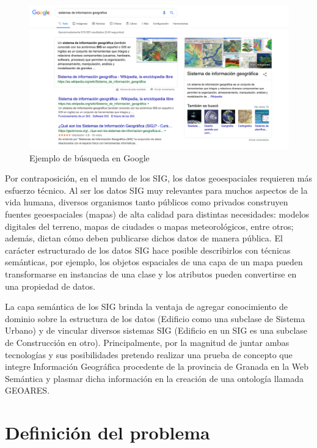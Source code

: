 \begin{figure}[H]
	\centering
	\includegraphics[width=1.07\linewidth]{imagenes/capitulo1/ejemplo-sig1}
	\caption{Ejemplo de búsqueda en Google}
	\label{fig:ejemplo-sig}
\end{figure}

Por contraposición, en el mundo de los SIG, los datos geoespaciales requieren más esfuerzo técnico. Al ser los datos SIG muy relevantes para muchos aspectos de la vida humana, diversos organismos tanto públicos como privados construyen fuentes geoespaciales (mapas) de alta calidad para distintas necesidades: modelos digitales del terreno, mapas de ciudades o mapas meteorológicos, entre otros; además, dictan cómo deben publicarse dichos datos de manera pública. El carácter estructurado de los datos SIG hace posible describirlos con técnicas semánticas, por ejemplo, los objetos espaciales de una capa de un mapa pueden transformarse en instancias de una clase y los atributos pueden convertirse en una propiedad de datos.

La capa semántica de los SIG brinda la ventaja de agregar conocimiento de dominio sobre la estructura de los datos (Edificio como una subclase de Sistema Urbano) y de vincular diversos sistemas SIG (Edificio en un SIG es una subclase de Construcción en otro). Principalmente, por la magnitud de juntar ambas tecnologías y sus posibilidades pretendo realizar una prueba de concepto que integre Información Geográfica procedente de la provincia de Granada en la Web Semántica y plasmar dicha información en la creación de una ontología llamada GEOARES.


\section{Definición del problema}

